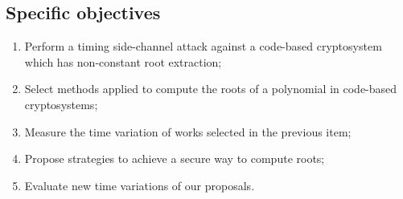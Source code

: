 \subsection{Specific objectives}
\begin{enumerate}[label=\roman*., itemsep=1pt]
    \item Perform a timing side-channel attack against a code-based cryptosystem which has non-constant root extraction;
    \item Select methods applied to compute the roots of a polynomial in code-based cryptosystems;
    \item Measure the time variation of works selected in the previous item;
    \item Propose strategies to achieve a secure way to compute roots;
    \item Evaluate new time variations of our proposals.
\end{enumerate}


